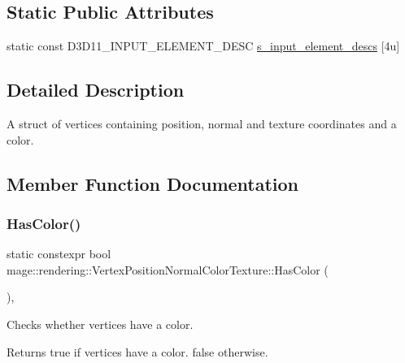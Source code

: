 \subsection*{Static Public Attributes}
\begin{DoxyCompactItemize}
\item 
static const D3\+D11\+\_\+\+I\+N\+P\+U\+T\+\_\+\+E\+L\+E\+M\+E\+N\+T\+\_\+\+D\+E\+SC \mbox{\hyperlink{structmage_1_1rendering_1_1_vertex_position_normal_color_texture_afb6520a849586814eb01861f3b46627d}{s\+\_\+input\+\_\+element\+\_\+descs}} \mbox{[}4u\mbox{]}
\end{DoxyCompactItemize}


\subsection{Detailed Description}
A struct of vertices containing position, normal and texture coordinates and a color. 

\subsection{Member Function Documentation}
\mbox{\label{structmage_1_1rendering_1_1_vertex_position_normal_color_texture_a1688dd4509c6766bea6fc15a4bcb348d}} 
\subsubsection{\texorpdfstring{Has\+Color()}{HasColor()}}
{\footnotesize\ttfamily static constexpr bool mage\+::rendering\+::\+Vertex\+Position\+Normal\+Color\+Texture\+::\+Has\+Color (\begin{DoxyParamCaption}{ }\end{DoxyParamCaption})\hspace{0.3cm}{\ttfamily [static]}, {\ttfamily [noexcept]}}

Checks whether vertices have a color.

\begin{DoxyReturn}{Returns}
{\ttfamily true} if vertices have a color. {\ttfamily false} otherwise. 
\end{DoxyReturn}
\mbox{\label{structmage_1_1rendering_1_1_vertex_position_normal_color_texture_aa8f1585c1dba229b765d5697a37cb0e6}} 
